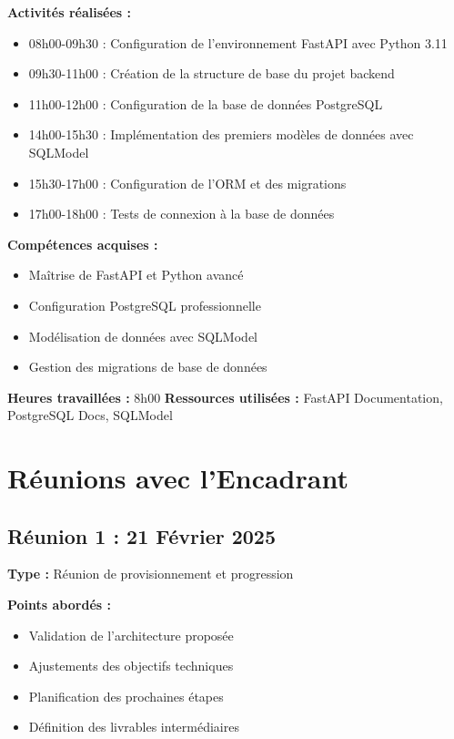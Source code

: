 \documentclass[12pt,a4paper]{article}
\begin{document}
\textbf{Activités réalisées :}
\begin{itemize}
    \item 08h00-09h30 : Configuration de l'environnement FastAPI avec Python 3.11
    \item 09h30-11h00 : Création de la structure de base du projet backend
    \item 11h00-12h00 : Configuration de la base de données PostgreSQL
    \item 14h00-15h30 : Implémentation des premiers modèles de données avec SQLModel
    \item 15h30-17h00 : Configuration de l'ORM et des migrations
    \item 17h00-18h00 : Tests de connexion à la base de données
\end{itemize}

\textbf{Compétences acquises :}
\begin{itemize}
    \item Maîtrise de FastAPI et Python avancé
    \item Configuration PostgreSQL professionnelle
    \item Modélisation de données avec SQLModel
    \item Gestion des migrations de base de données
\end{itemize}

\textbf{Heures travaillées :} 8h00
\textbf{Ressources utilisées :} FastAPI Documentation, PostgreSQL Docs, SQLModel


\section{Réunions avec l'Encadrant}

\subsection{Réunion 1 : 21 Février 2025}
\textbf{Type :} Réunion de provisionnement et progression

\textbf{Points abordés :}
\begin{itemize}
    \item Validation de l'architecture proposée
    \item Ajustements des objectifs techniques
    \item Planification des prochaines étapes
    \item Définition des livrables intermédiaires
\end{itemize}
\end{document}
